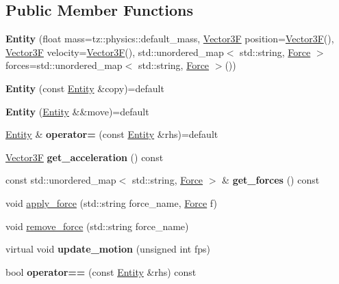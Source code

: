 \subsection*{Public Member Functions}
\begin{DoxyCompactItemize}
\item 
\mbox{\label{class_entity_a3ea551d0b884fb446fca98d544fd8eb9}} 
{\bfseries Entity} (float mass=tz\+::physics\+::default\+\_\+mass, \mbox{\hyperlink{class_vector3}{Vector3F}} position=\mbox{\hyperlink{class_vector3}{Vector3F}}(), \mbox{\hyperlink{class_vector3}{Vector3F}} velocity=\mbox{\hyperlink{class_vector3}{Vector3F}}(), std\+::unordered\+\_\+map$<$ std\+::string, \mbox{\hyperlink{class_force}{Force}} $>$ forces=std\+::unordered\+\_\+map$<$ std\+::string, \mbox{\hyperlink{class_force}{Force}} $>$())
\item 
\mbox{\label{class_entity_ac777f0e394a2b85c335cd38d43312541}} 
{\bfseries Entity} (const \mbox{\hyperlink{class_entity}{Entity}} \&copy)=default
\item 
\mbox{\label{class_entity_a8ce6d452934060e62bd67a44b63b2731}} 
{\bfseries Entity} (\mbox{\hyperlink{class_entity}{Entity}} \&\&move)=default
\item 
\mbox{\label{class_entity_aac1f2e433bf48749605ac1d429c8ebdf}} 
\mbox{\hyperlink{class_entity}{Entity}} \& {\bfseries operator=} (const \mbox{\hyperlink{class_entity}{Entity}} \&rhs)=default
\item 
\mbox{\label{class_entity_a258dd08534ffaa0616f99dde23122c2c}} 
\mbox{\hyperlink{class_vector3}{Vector3F}} {\bfseries get\+\_\+acceleration} () const
\item 
\mbox{\label{class_entity_a813cb9a64c2fa7cf50b2205590137b7a}} 
const std\+::unordered\+\_\+map$<$ std\+::string, \mbox{\hyperlink{class_force}{Force}} $>$ \& {\bfseries get\+\_\+forces} () const
\item 
void \mbox{\hyperlink{class_entity_a4cc3373fa2900d430a41e9a6b0242109}{apply\+\_\+force}} (std\+::string force\+\_\+name, \mbox{\hyperlink{class_force}{Force}} f)
\item 
void \mbox{\hyperlink{class_entity_a2bdf4edf238deca2feaffed91c25ad8a}{remove\+\_\+force}} (std\+::string force\+\_\+name)
\item 
\mbox{\label{class_entity_a1436603c56c8a946747ab748f262a577}} 
virtual void {\bfseries update\+\_\+motion} (unsigned int fps)
\item 
\mbox{\label{class_entity_aabb0ea8942712e76f5d85129661c1ef7}} 
bool {\bfseries operator==} (const \mbox{\hyperlink{class_entity}{Entity}} \&rhs) const
\end{DoxyCompactItemize}
